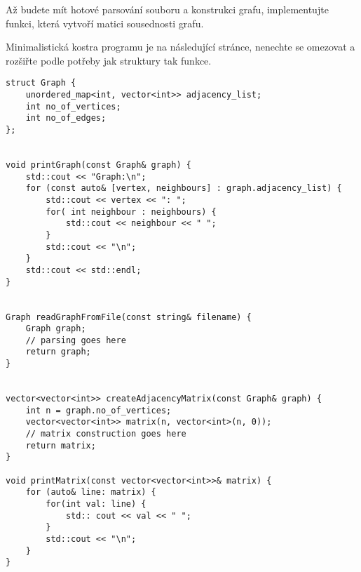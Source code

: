 \documentclass[12pt,oneside]{article}
\begin{document}
	Až budete mít hotové parsování souboru a konstrukci grafu, implementujte funkci, která vytvoří matici sousednosti grafu.
	
	Minimalistická kostra programu je na následující stránce, nenechte se omezovat a rozšiřte podle potřeby jak struktury tak funkce.
	
\newpage
	
\begin{lstlisting}
struct Graph {
	unordered_map<int, vector<int>> adjacency_list;
	int no_of_vertices;
	int no_of_edges;
};


void printGraph(const Graph& graph) {
	std::cout << "Graph:\n";
	for (const auto& [vertex, neighbours] : graph.adjacency_list) {
		std::cout << vertex << ": ";
		for( int neighbour : neighbours) {
			std::cout << neighbour << " ";
		}
		std::cout << "\n";
	}
	std::cout << std::endl;
}


Graph readGraphFromFile(const string& filename) {
	Graph graph;
	// parsing goes here
	return graph;
}


vector<vector<int>> createAdjacencyMatrix(const Graph& graph) {
	int n = graph.no_of_vertices;
	vector<vector<int>> matrix(n, vector<int>(n, 0));
	// matrix construction goes here
	return matrix;
}

void printMatrix(const vector<vector<int>>& matrix) {
	for (auto& line: matrix) {
		for(int val: line) {
			std:: cout << val << " ";
		}
		std::cout << "\n";
	}
}
\end{lstlisting}
	
	
\end{document}
